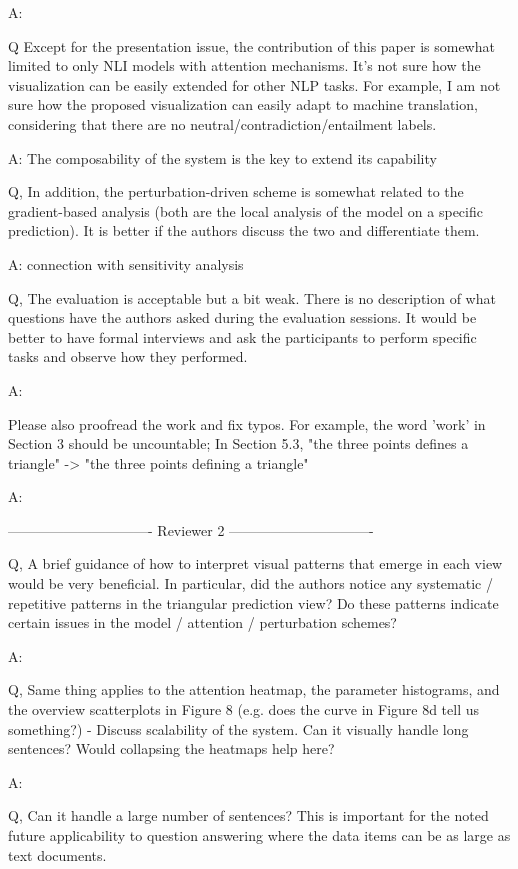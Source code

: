 A:

Q Except for the presentation issue, the contribution of this paper is somewhat limited to only NLI models with attention mechanisms. It's not sure how the visualization can be easily extended for other NLP tasks. For example, I am not sure how the proposed visualization can easily adapt to machine translation, considering that there are no neutral/contradiction/entailment labels.

A: The composability of the system is the key to extend its capability

Q, In addition, the perturbation-driven scheme is somewhat related to the gradient-based analysis (both are the local analysis of the model on a specific prediction). It is better if the authors discuss the two and differentiate them.

A: connection with sensitivity analysis

Q, The evaluation is acceptable but a bit weak. There is no description of what questions have the authors asked during the evaluation sessions. It would be better to have formal interviews and ask the participants to perform specific tasks and observe how they performed.

A:

Please also proofread the work and fix typos. For example, the word 'work' in Section 3 should be uncountable; In Section 5.3, "the three points defines a triangle" -> "the three points defining a triangle"

A:

------------------------------- Reviewer 2 -------------------------------

Q, A brief guidance of how to interpret visual patterns that emerge in each view would be very beneficial. In particular, did the authors notice any systematic / repetitive patterns in the triangular prediction view? Do these patterns indicate certain issues in the model / attention / perturbation schemes?

A:

Q, Same thing applies to the attention heatmap, the parameter histograms, and the overview scatterplots in Figure 8 (e.g. does the curve in Figure 8d tell us something?)
- Discuss scalability of the system. Can it visually handle long sentences? Would collapsing the heatmaps help here?

A:

Q, Can it handle a large number of sentences? This is important for the noted future applicability to question answering where the data items can be as large as text documents.


